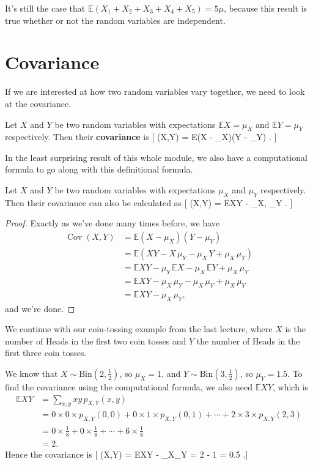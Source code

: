 \documentclass[
  letterpaper,
]{report}
\theoremstyle{definition}
\theoremstyle{definition}
\theoremstyle{remark}
\begin{document}
It's still the case that
\(\mathbb E(X_1 + X_2 + X_3 + X_4 + X_5) = 5\mu\), because this result
is true whether or not the random variables are independent.

\hypertarget{covariance}{%
\section{Covariance}\label{covariance}}

If we are interested at how two random variables vary together, we need
to look at the covariance.

\newcommand{\Cov}{\operatorname{Cov}}
\newcommand{\Corr}{\operatorname{Corr}}

Let \(X\) and \(Y\) be two random variables with expectations
\(\mathbb EX =\mu_X\) and \(\mathbb EY = \mu_Y\) respectively. Then
their \textbf{covariance} is {[} (X,Y) = \mathbb E(X -
\mu\_X)(Y - \mu\_Y) . {]}

In the least surprising result of this whole module, we also have a
computational formula to go along with this definitional formula.

Let \(X\) and \(Y\) be two random variables with expectations \(\mu_X\)
and \(\mu_Y\) respectively. Then their covariance can also be calculated
as {[} (X,Y) = \mathbb EXY - \mu\_X, \mu\_Y . {]}

\begin{proof}

Exactly as we've done many times before, we have \begin{align*}
\operatorname{Cov}(X,Y) &= \mathbb E(X - \mu_X)(Y - \mu_Y) \\
&= \mathbb E(XY - X\,\mu_Y - \mu_X\, Y + \mu_X\,\mu_Y) \\
&= \mathbb EXY  - \mu_Y \,\mathbb EX - \mu_X \,\mathbb EY + \mu_X \, \mu_Y \\
&= \mathbb EXY - \mu_X \, \mu_Y - \mu_X \, \mu_Y + \mu_X \, \mu_Y \\
&= \mathbb EXY - \mu_X \, \mu_Y ,
\end{align*} and we're done.

\end{proof}

We continue with our coin-tossing example from the last lecture, where
\(X\) is the number of Heads in the first two coin tosses and \(Y\) the
number of Heads in the first three coin tosses.

We know that \(X \sim \text{Bin}(2, \frac12)\), so \(\mu_X = 1\), and
\(Y \sim \text{Bin}(3, \frac12)\), so \(\mu_Y = 1.5\). To find the
covariance using the computational formula, we also need
\(\mathbb EXY\), which is \begin{align*}
\mathbb EXY &= \sum_{x,y} xy\, p_{X,Y}(x,y) \\
  &= 0\times 0\times p_{X,Y}(0,0) + 0 \times 1 \times p_{X,Y}(0,1) + \cdots + 2\times 3 \times p_{X,Y}(2,3) \\
  &= 0 \times \tfrac18 + 0 \times \tfrac18 + \cdots + 6 \times \tfrac18 \\
  &= 2.
\end{align*} Hence the covariance is {[}  (X,Y) =
\mathbb EXY - \mu\_X\mu\_Y = 2 - 1  = 0.5 .{]}
\end{document}
